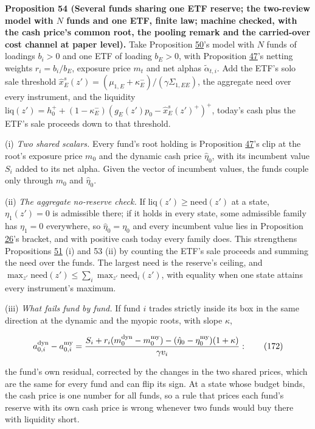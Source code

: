 \documentclass[11pt]{article}
\begin{document}
\label{res:Proposition-54}
\textbf{Proposition 54 (Several funds sharing one ETF reserve; the two-review model with \(N\) funds and one ETF, finite law; machine checked, with the cash price's common root, the pooling remark and the carried-over cost channel at paper level).}
Take Proposition \hyperref[res:Proposition-50]{50}'s model with \(N\) funds of loadings \(b_i>0\) and one ETF of
loading \(b_E>0\), with Proposition \hyperref[res:Proposition-47]{47}'s netting weights \(r_i=b_i/b_E\), exposure
price \(m_t\) and net alphas \(\tilde\alpha_{t,i}\). Add the ETF's solo sale threshold
\(\hat x^s_E(z')=(\mu_{1,E}+\kappa^-_E)/(\gamma\Sigma_{1,EE})\), the aggregate need over every instrument,
and the liquidity \(\mathrm{liq}(z')=h^+_0+(1-\kappa^-_E)(g_E(z')p_0-\hat x^s_E(z')^+)^+\), today's cash
plus the ETF's sale proceeds down to that threshold.

(i) \emph{Two shared scalars.} Every fund's root holding is Proposition \hyperref[res:Proposition-47]{47}'s
clip at the root's exposure price \(m_0\) and the dynamic cash price \(\hat\eta_0\),
with its incumbent value \(S_i\) added to its net alpha. Given the vector
of incumbent values, the funds couple only through \(m_0\) and \(\hat\eta_0\).

(ii) \emph{The aggregate no-reserve check.} If \(\mathrm{liq}(z')\geq\mathrm{need}(z')\) at a state,
\(\eta_1(z')=0\) is admissible there; if it holds in every state, some admissible
family has \(\eta_1=0\) everywhere, so \(\hat\eta_0=\eta_0\) and every incumbent value lies
in Proposition \hyperref[res:Proposition-26]{26}'s bracket, and with positive cash today every
family does. This strengthens Propositions \hyperref[res:Proposition-51]{51} (i) and 53 (ii) by
counting the ETF's sale proceeds and summing the need over the funds.
The largest need is the reserve's ceiling, and
\(\max_{z'}\mathrm{need}(z')\leq\sum_i\max_{z'}\mathrm{need}_i(z')\), with equality when one state attains every
instrument's maximum.

(iii) \emph{What fails fund by fund.} If fund \(i\) trades strictly inside its
box in the same direction at the dynamic and the myopic roots, with
slope \(\kappa\),

\begin{equation*}
a^{\rm dyn}_{0,i}-a^{\rm my}_{0,i}=\frac{S_i+r_i(m^{\rm dyn}_0-m^{\rm my}_0)-(\hat\eta_0-\eta^{\rm my}_0)(1+\kappa)}{\gamma v_i}:\tag{172}\label{eq:172}
\end{equation*}

the fund's own residual, corrected by the changes in the two shared
prices, which are the same for every fund and can flip its sign. At a
state whose budget binds, the cash price is one number for all funds,
so a rule that prices each fund's reserve with its own cash price is
wrong whenever two funds would buy there with liquidity short.
\end{document}
